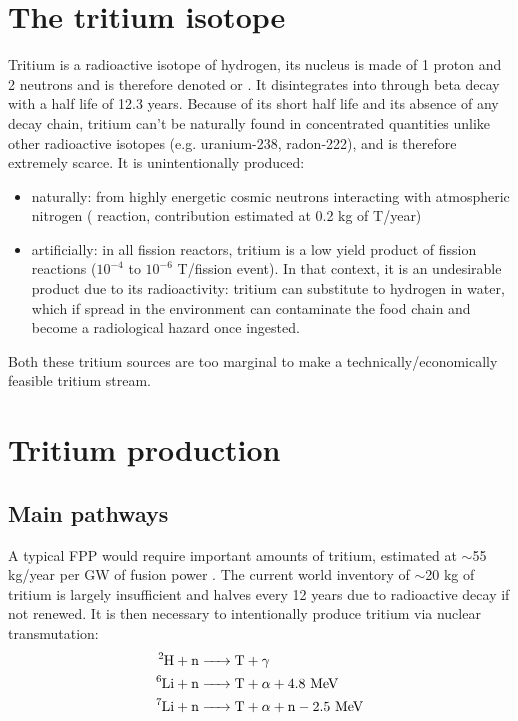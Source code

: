\documentclass[a4paper,11pt,oneside]{report}
\begin{document}
\section{The tritium isotope}
Tritium is a radioactive isotope of hydrogen, its nucleus is made of 1 proton and 2 neutrons and is therefore denoted  or . It disintegrates into  through beta decay with a half life of 12.3 years. 
Because of its short half life and its absence of any decay chain, tritium can't be naturally found in concentrated quantities unlike other radioactive isotopes (e.g. uranium-238, radon-222), and is therefore extremely scarce. It is unintentionally produced: 
\begin{itemize}
    \item naturally: from highly energetic cosmic neutrons interacting with atmospheric nitrogen ( reaction, contribution estimated at 0.2 kg of T/year)
    \item artificially: in all fission reactors, tritium is a low yield product of fission reactions ($10^{-4}$ to $10^{-6}$ T/fission event\cite{noauthor_livechart_nodate}). In that context, it is an undesirable product due to its radioactivity: tritium can substitute to hydrogen in water, which if spread in the environment can contaminate the food chain and become a radiological hazard once ingested. %
\end{itemize}
Both these tritium sources are too marginal to make a technically/economically feasible tritium stream. 


\section{Tritium production}
\subsection{Main pathways}
A typical FPP would require important amounts of tritium, estimated at $\sim$55 kg/year per GW of fusion power \cite{abdou_physics_2020}. The current world inventory of $\sim$20 kg of tritium is largely insufficient and halves every 12 years due to radioactive decay if not renewed. It is then necessary to intentionally produce tritium via nuclear transmutation:
\begin{align}
    \ce{^2H + n &-> T + \gamma} \label{eq:D2_capture}\\
    \ce{^6Li + n &-> T + \alpha} + 4.8~\mathrm{MeV} \label{eq:Li6_capture}\\
    \ce{^7Li + n &-> T + \alpha} + \mathrm{n} - 2.5~\mathrm{MeV} \label{eq:Li7_capture}
\end{align}
\end{document}
